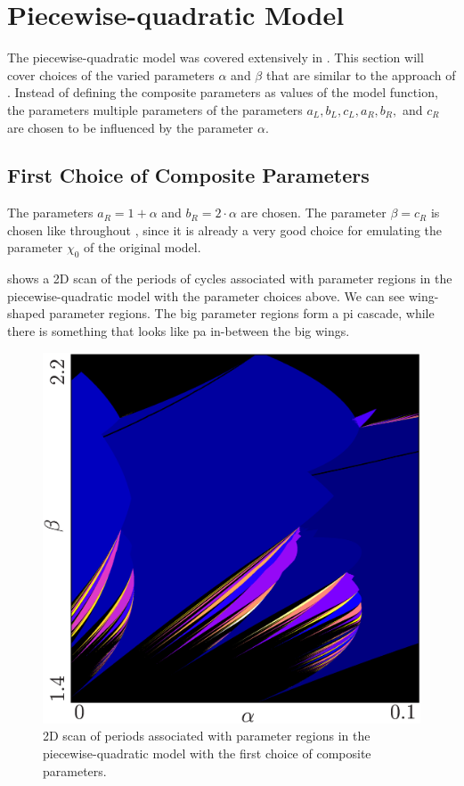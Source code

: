 \section{Piecewise-quadratic Model}

The piecewise-quadratic model was covered extensively in .
This section will cover choices of the varied parameters $\alpha$ and $\beta$ that are similar to the approach of .
Instead of defining the composite parameters as values of the model function, the parameters multiple parameters of the parameters $a_L, b_L, c_L, a_R, b_R,$ and $c_R$ are chosen to be influenced by the parameter $\alpha$.

\subsection{First Choice of Composite Parameters}

The parameters $a_R = 1 + \alpha$ and $b_R = 2 \cdot \alpha$ are chosen.
The parameter $\beta = c_R$ is chosen like throughout , since it is already a very good choice for emulating the parameter $\chi_0$ of the original model.

 shows a 2D scan of the periods of cycles associated with parameter regions in the piecewise-quadratic model with the parameter choices above.
We can see wing-shaped parameter regions.
The big parameter regions form a \gls{pi} cascade, while there is something that looks like \gls{pa} in-between the big wings.

\begin{figure}
	\centering
	\includegraphics[width=.7 \textwidth]{../Figures/A/A.3/result.png}
	\caption[2D scan of periods associated with parameter regions in the piecewise-quadratic model with the first choice of composite parameters]{
		2D scan of periods associated with parameter regions in the piecewise-quadratic model with the first choice of composite parameters.
	}
	\label{fig:app.model.quad.first}
\end{figure}

